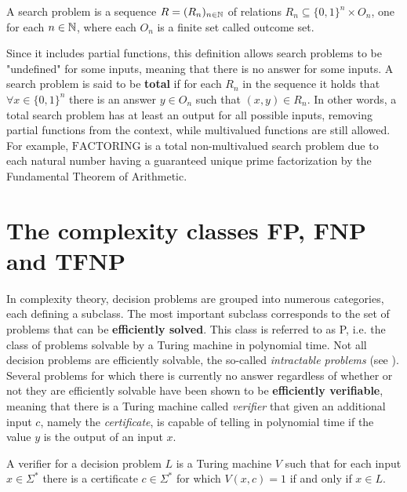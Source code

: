 \begin{definition}
 A search problem is a sequence $R = (R_n)_{n \in \mathbb{N}}$ of relations $R_n \subseteq \{0,1\}^n \times O_n$, one for each $n \in \mathbb{N}$, where each $O_n$ is a finite set called outcome set.
\end{definition}

Since it includes partial functions, this definition allows search problems to be "undefined" for some inputs, meaning that there is no answer for some inputs. A search problem is said to be \textbf{total} if for each $R_n$ in the sequence it holds that $\forall x \in \{0,1\}^n$ there is an answer $y \in O_n$ such that $(x,y) \in R_n$. In other words, a total search problem has at least an output for all possible inputs, removing partial functions from the context, while multivalued functions are still allowed. For example, $\mathrm{FACTORING}$ is a total non-multivalued search problem due to each natural number having a guaranteed unique prime factorization by the Fundamental Theorem of Arithmetic.

\newpage

\section{The complexity classes \textsf{FP}, \textsf{FNP} and \textsf{TFNP}}

In complexity theory, decision problems are grouped into numerous categories, each defining a subclass. The most important subclass corresponds to the set of problems that can be \textbf{efficiently solved}. This class is referred to as \textsf{P}, i.e. the class of problems solvable by a Turing machine in polynomial time. Not all decision problems are efficiently solvable, the so-called \textit{intractable problems} (see ). Several problems for which there is currently no answer regardless of whether or not they are efficiently solvable have been shown to be \textbf{efficiently verifiable}, meaning that there is a Turing machine called \textit{verifier} that given an additional input $c$, namely the \textit{certificate}, is capable of telling in polynomial time if the value $y$ is the output of an input $x$.

\begin{definition}
 A verifier for a decision problem $L$ is a Turing machine $V$ such that for each input $x \in \Sigma^*$ there is a certificate $c \in \Sigma^*$ for which $V(x,c) = 1$ if and only if $x \in L$.
\end{definition}

